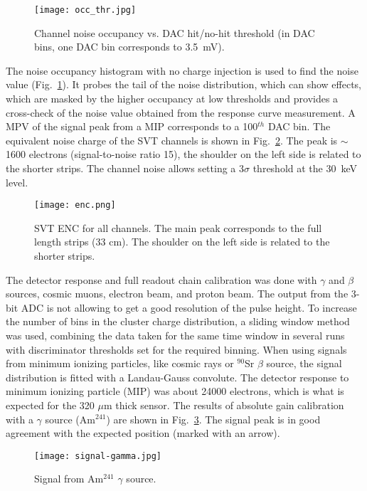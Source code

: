 \begin{figure}[hbt] 
\centering 
\texttt{[image: occ\_thr.jpg]}
\caption{Channel noise occupancy vs. DAC hit/no-hit threshold (in DAC bins, one DAC bin corresponds to 3.5~mV).}
\label{fig:noiseocc}
\end{figure}

The noise occupancy histogram with no charge injection is used to find the noise value (Fig.~\ref{fig:noiseocc}). It probes the tail of the noise distribution, which can show effects, which are masked by the higher occupancy at low thresholds and provides a cross-check of the noise value obtained from the response curve measurement. A MPV of the signal peak from a MIP corresponds to a 100$^{th}$ DAC bin. The equivalent noise charge of the SVT channels is shown in  Fig.~\ref{fig:enc}. The peak is $\sim$1600 electrons (signal-to-noise ratio 15), the shoulder on the left side is related to the shorter strips. The channel noise allows setting a 3$\sigma$ threshold at the 30~keV level. 

\begin{figure}[hbt] 
	\centering 
	\texttt{[image: enc.png]}
	\caption{SVT ENC for all channels. The main peak corresponds to the full length strips (33 cm). The shoulder on the left side is related to the shorter strips.}
	\label{fig:enc}
\end{figure}

The detector response and full readout chain calibration was done with $\gamma$ and $\beta$ sources, cosmic muons, electron beam, and proton beam. The output from the 3-bit ADC is not allowing to get a good resolution of the pulse height. To increase the number of bins in the cluster charge distribution, a sliding window method was used, combining the data taken for the same time window in several runs with discriminator thresholds set for the required binning. When using signals from minimum ionizing particles, like cosmic rays or $^{90}$Sr $\beta$ source, the signal distribution is fitted with a Landau-Gauss convolute. The detector response to minimum ionizing particle (MIP) was about 24000 electrons, which is what is expected for the 320 $\mu$m thick sensor. The results of absolute gain calibration with a $\gamma$ source (Am$^{241}$) are shown in Fig.~\ref{fig:signal-gamma}. The signal peak is in good agreement with the expected position (marked with an arrow). 

\begin{figure}[hbt] 
	\centering 
	\texttt{[image: signal-gamma.jpg]}
	\caption{Signal from Am$^{241}$ $\gamma$ source.}
	\label{fig:signal-gamma}
\end{figure}

